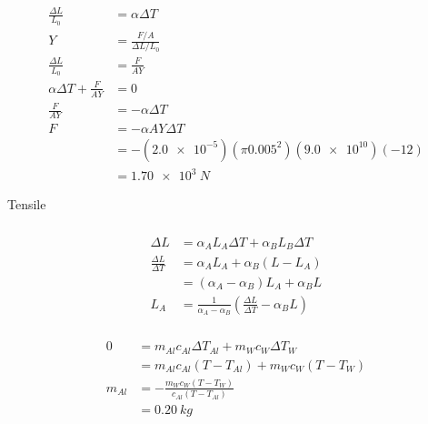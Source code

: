 \documentclass{article}
\begin{document}
\subsubsection{}

\begin{align*}
  \frac{\Delta L}{L_0}            & = \alpha \Delta T                                    \\
  Y                               & = \frac{F / A}{\Delta L / L_0}                       \\
  \frac{\Delta L}{L_0}            & = \frac{F}{A Y}                                      \\
  \alpha \Delta T + \frac{F}{A Y} & = 0                                                  \\
  \frac{F}{A Y}                   & = -\alpha \Delta T                                   \\
  F                               & = -\alpha A Y \Delta T                               \\
                                  & = -(\num{2.0e-5}) (\pi 0.005^2) (\num{9.0e10}) (-12) \\
                                  & = \qty{1.70e3}{N}
\end{align*}

Tensile

\subsubsection{}

\begin{align*}
  \Delta L                  & = \alpha_A L_A \Delta T + \alpha_B L_B \Delta T                                       \\
  \frac{\Delta L}{\Delta T} & = \alpha_A L_A + \alpha_B (L - L_A)                                                   \\
                            & = (\alpha_A - \alpha_B) L_A + \alpha_B L                                              \\
  L_A                       & = \frac{1}{\alpha_A - \alpha_B} \left( \frac{\Delta L}{\Delta T} - \alpha_B L \right)
\end{align*}

\subsubsection{}

\begin{align*}
  0      & = m_{Al} c_{Al} \Delta T_{Al} + m_W c_W \Delta T_W \\
         & = m_{Al} c_{Al} (T - T_{Al}) + m_W c_W (T - T_W)   \\
  m_{Al} & = -\frac{m_W c_W (T - T_W)}{c_{Al} (T - T_{Al})}   \\
         & = \qty{0.20}{kg}
\end{align*}
\end{document}
